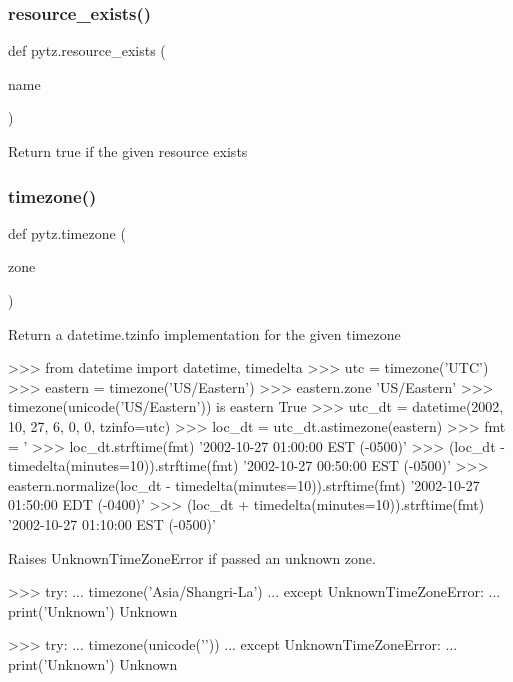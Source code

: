 \subsubsection{\texorpdfstring{resource\+\_\+exists()}{resource\_exists()}}
{\footnotesize\ttfamily def pytz.\+resource\+\_\+exists (\begin{DoxyParamCaption}\item[{}]{name }\end{DoxyParamCaption})}

\begin{DoxyVerb}Return true if the given resource exists\end{DoxyVerb}
 \mbox{\label{namespacepytz_a864aeabe33e444f56b55e925803db0be}} 
\subsubsection{\texorpdfstring{timezone()}{timezone()}}
{\footnotesize\ttfamily def pytz.\+timezone (\begin{DoxyParamCaption}\item[{}]{zone }\end{DoxyParamCaption})}

\begin{DoxyVerb}Return a datetime.tzinfo implementation for the given timezone

>>> from datetime import datetime, timedelta
>>> utc = timezone('UTC')
>>> eastern = timezone('US/Eastern')
>>> eastern.zone
'US/Eastern'
>>> timezone(unicode('US/Eastern')) is eastern
True
>>> utc_dt = datetime(2002, 10, 27, 6, 0, 0, tzinfo=utc)
>>> loc_dt = utc_dt.astimezone(eastern)
>>> fmt = '%
>>> loc_dt.strftime(fmt)
'2002-10-27 01:00:00 EST (-0500)'
>>> (loc_dt - timedelta(minutes=10)).strftime(fmt)
'2002-10-27 00:50:00 EST (-0500)'
>>> eastern.normalize(loc_dt - timedelta(minutes=10)).strftime(fmt)
'2002-10-27 01:50:00 EDT (-0400)'
>>> (loc_dt + timedelta(minutes=10)).strftime(fmt)
'2002-10-27 01:10:00 EST (-0500)'

Raises UnknownTimeZoneError if passed an unknown zone.

>>> try:
...     timezone('Asia/Shangri-La')
... except UnknownTimeZoneError:
...     print('Unknown')
Unknown

>>> try:
...     timezone(unicode(''))
... except UnknownTimeZoneError:
...     print('Unknown')
Unknown\end{DoxyVerb}
 

